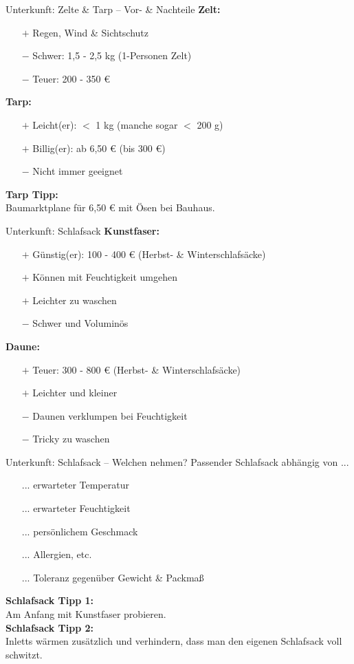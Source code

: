 \documentclass{beamer}
\newcommand{\tipp}[2][Tipp]{\vspace{0.2cm}\textbf{#1:}\\#2}
\begin{document}
			\begin{frame}{Unterkunft: Zelte \& Tarp -- Vor- \& Nachteile}
				\textbf{Zelt:}
				\begin{itemize}
					\item[$+$] Regen, Wind \& Sichtschutz
					\item[$-$] Schwer: 1,5 - 2,5 kg (1-Personen Zelt)
					\item[$-$] Teuer: 200 - 350 €
				\end{itemize}\pause
				\textbf{Tarp:}
				\begin{itemize}
					\item[$+$] Leicht(er): $<$ 1 kg (manche sogar $<$ 200 g)
					\item[$+$] Billig(er): ab 6,50 € (bis 300 €)
					\item[$-$] Nicht immer geeignet
				\end{itemize}\pause
				\tipp[Tarp Tipp]{Baumarktplane für 6,50 € mit Ösen bei Bauhaus.}
			\end{frame}
			
			\begin{frame}{Unterkunft: Schlafsack}
				\textbf{Kunstfaser:}
				\begin{itemize}
					\item[$+$] Günstig(er): 100 - 400 € (Herbst- \& Winterschlafsäcke)
					\item[$+$] Können mit Feuchtigkeit umgehen
					\item[$+$] Leichter zu waschen
					\item[$-$] Schwer und Voluminös
				\end{itemize}\pause
				\textbf{Daune:}
				\begin{itemize}
					\item[$+$] Teuer: 300 - 800 € (Herbst- \& Winterschlafsäcke)
					\item[$+$] Leichter und kleiner
					\item[$-$] Daunen verklumpen bei Feuchtigkeit
					\item[$-$] Tricky zu waschen
				\end{itemize}
			\end{frame}
			
			\begin{frame}{Unterkunft: Schlafsack -- Welchen nehmen?}
				Passender Schlafsack abhängig von ...
				\begin{itemize}
					\item[...] erwarteter Temperatur
					\item[...] erwarteter Feuchtigkeit
					\item[...] persönlichem Geschmack
					\item[...] Allergien, etc.
					\item[...] Toleranz gegenüber Gewicht \& Packmaß
				\end{itemize}\pause
				\tipp[Schlafsack Tipp 1]{Am Anfang mit Kunstfaser probieren.}\\\pause
				\tipp[Schlafsack Tipp 2]{Inletts wärmen zusätzlich und verhindern, dass man den eigenen Schlafsack voll schwitzt.}
			\end{frame}
			
\end{document}
